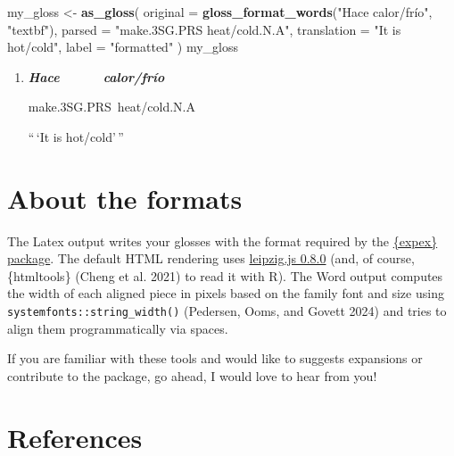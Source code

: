 \documentclass[
]{article}
\newenvironment{Shaded}{\begin{snugshade}}{\end{snugshade}}
\newcommand{\AttributeTok}[1]{\textcolor[rgb]{0.13,0.29,0.53}{#1}}
\newcommand{\FunctionTok}[1]{\textcolor[rgb]{0.13,0.29,0.53}{\textbf{#1}}}
\newcommand{\NormalTok}[1]{#1}
\newcommand{\OtherTok}[1]{\textcolor[rgb]{0.56,0.35,0.01}{#1}}
\newcommand{\StringTok}[1]{\textcolor[rgb]{0.31,0.60,0.02}{#1}}
\begin{document}
\begin{Shaded}
\begin{Highlighting}[]
\NormalTok{my\_gloss }\OtherTok{\textless{}{-}} \FunctionTok{as\_gloss}\NormalTok{(}
  \AttributeTok{original =} \FunctionTok{gloss\_format\_words}\NormalTok{(}\StringTok{"Hace calor/frío"}\NormalTok{, }\StringTok{"textbf"}\NormalTok{),}
  \AttributeTok{parsed =} \StringTok{"make.3SG.PRS heat/cold.N.A"}\NormalTok{,}
  \AttributeTok{translation =} \StringTok{"\textquotesingle{}It is hot/cold\textquotesingle{}"}\NormalTok{,}
  \AttributeTok{label =} \StringTok{"formatted"}
\NormalTok{)}
\NormalTok{my\_gloss}
\end{Highlighting}
\end{Shaded}

\begin{enumerate}
\def\labelenumi{(\arabic{enumi})}
\setcounter{enumi}{6}
\item
  \emph{\textbf{Hace}}~~~~~~~\emph{\textbf{calor/frío}}~

  make.3SG.PRS~heat/cold.N.A~

  ``\,`It is hot/cold'\,''
\end{enumerate}

\hypertarget{about-the-formats}{%
\section{About the formats}\label{about-the-formats}}

The Latex output writes your glosses with the format required by the \href{https://ctan.org/pkg/expex?lang=en}{\{expex\} package}. The default HTML rendering uses \href{https://github.com/bdchauvette/leipzig.js/}{leipzig.js 0.8.0} (and, of course, \{htmltools\} (Cheng et al. 2021) to read it with R). The Word output computes the width of each aligned piece in pixels based on the family font and size using \texttt{systemfonts::string\_width()} (Pedersen, Ooms, and Govett 2024) and tries to align them programmatically via spaces.

If you are familiar with these tools and would like to suggests expansions or contribute to the package, go ahead, I would love to hear from you!

\hypertarget{references}{%
\section*{References}\label{references}}
\end{document}
